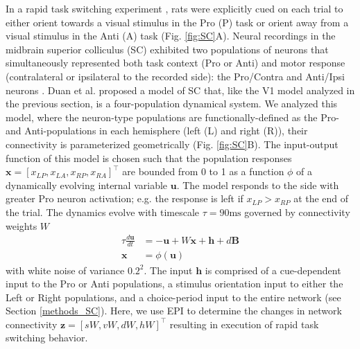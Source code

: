 \documentclass[11pt]{article}
\begin{document}
In a rapid task switching experiment \cite{duan2015requirement}, rats were explicitly cued on each trial to either orient towards a visual stimulus in the Pro (P) task or orient away from a visual stimulus in the Anti (A) task (Fig. \ref{fig:SC}A). 
Neural recordings in the midbrain superior colliculus (SC) exhibited two populations of neurons that simultaneously represented both task context (Pro or Anti) and motor response (contralateral or ipsilateral to the recorded side): the Pro/Contra and Anti/Ipsi neurons \cite{duan2018collicular}.
Duan et al. proposed a model of SC that, like the V1 model analyzed in the previous section, is a four-population dynamical system.  
We analyzed this model, where the neuron-type populations are functionally-defined as the Pro- and Anti-populations in each hemisphere (left (L) and right (R)), their connectivity is parameterized geometrically  (Fig. \ref{fig:SC}B).
The input-output function of this model is chosen such that the population responses $\mathbf{x} = [x_{LP}, x_{LA}, x_{RP}, x_{RA}]^\top$ are bounded from 0 to 1 as a function $\phi$ of a dynamically evolving internal variable $\mathbf{u}$.
The model responds to the side with greater Pro neuron activation; e.g. the response is left if $x_{LP} > x_{RP}$ at the end of the trial.
The dynamics evolve with timescale $\tau= 90\text{ms}$ governed by connectivity weights $W$
\begin{equation}
\begin{split}
\tau \frac{d\mathbf{u}}{dt} &= -\mathbf{u} + W\mathbf{x} + \mathbf{h} + d\mathbf{B} \\
\mathbf{x} &= \phi(\mathbf{u})
\end{split}
\end{equation}
with white noise of variance $0.2^2$.
The input $\mathbf{h}$ is comprised of a cue-dependent input to the Pro or Anti populations, a stimulus orientation input to either the Left or Right populations, and a choice-period input to the entire network (see Section \ref{methods_SC}).
Here, we use EPI to determine the changes in network connectivity $\mathbf{z} = [sW, vW, dW, hW]^{\top}$ resulting in execution of rapid task switching behavior.
\end{document}
